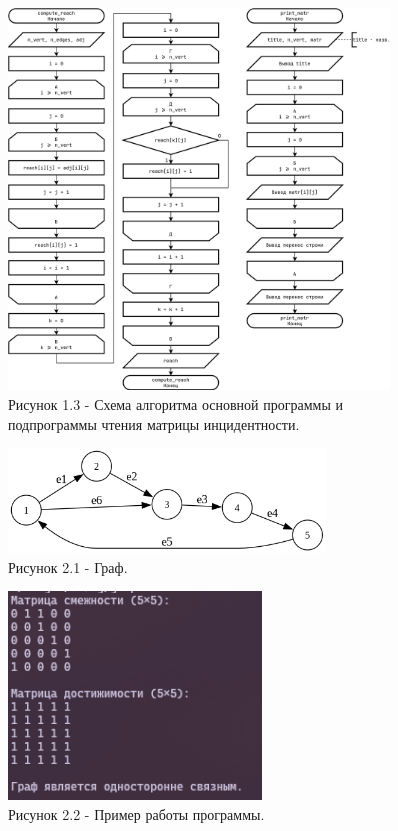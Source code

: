 \documentclass[oneside,a4paper,14pt]{extarticle}
\begin{document}
\clearpage
\begin{figure}[H]
	\centering
	\includegraphics[width=0.9\textwidth]{pics/flowchart3.png}
	\caption*{Рисунок 1.3 - Схема алгоритма основной программы и подпрограммы чтения матрицы инцидентности.}
\end{figure}

\clearpage
\begin{figure}[H]
	\centering
	\includegraphics[width=0.75\textwidth]{pics/graph.png}
	\caption*{Рисунок 2.1 - Граф.}
\end{figure}

\begin{figure}[H]
	\centering
	\includegraphics[width=0.6\textwidth]{pics/screen.png}
	\caption*{Рисунок 2.2 - Пример работы программы.}
\end{figure}
\end{document}

